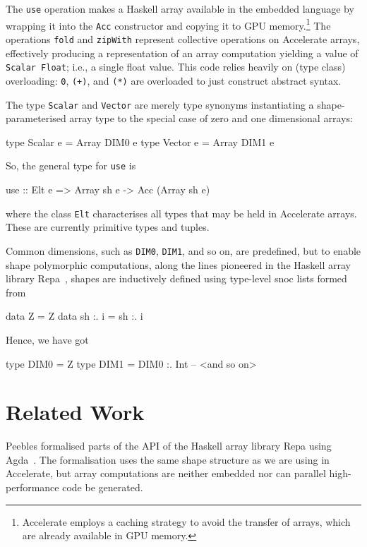 \documentclass{llncs}
\begin{document}
The \verb+use+ operation makes a Haskell array available in the embedded language by wrapping it into the \verb+Acc+ constructor and copying it to GPU memory.\footnote{Accelerate employs a caching strategy to avoid the transfer of arrays, which are already available in GPU memory.} The operations \texttt{fold} and \texttt{zipWith} represent collective operations on Accelerate arrays, effectively producing a representation of an array computation yielding a value of
\texttt{Scalar Float}; i.e., a single float value. This code relies
heavily on (type class) overloading: \texttt{0}, \texttt{(+)}, and
\texttt{(*)} are overloaded to just construct abstract syntax. 

The type \verb+Scalar+ and \verb+Vector+ are merely type synonyms instantiating a shape-parameterised array type to the special case of zero and one dimensional arrays:
%
\begin{hcode}
type Scalar e = Array DIM0 e
type Vector e = Array DIM1 e
\end{hcode}
%
So, the general type for \verb+use+ is
%
\begin{hcode}
use :: Elt e => Array sh e -> Acc (Array sh e)
\end{hcode}
%
where the class \verb+Elt+ characterises all types that may be held in Accelerate arrays. These are currently primitive types and tuples.

Common dimensions, such as \verb+DIM0+, \verb+DIM1+, and so on, are predefined, but to enable shape polymorphic computations, along the lines pioneered in the Haskell array library Repa~\cite{keller-etal:repa}, shapes are inductively defined using type-level snoc lists formed from
%
\begin{hcode}
data Z       = Z
data sh :. i = sh :. i
\end{hcode}
%
Hence, we have got
%
\begin{hcode}
type DIM0 = Z
type DIM1 = DIM0 :. Int
-- <and so on>
\end{hcode}

\section{Related Work}
\label{sec:related-work}

Peebles formalised parts of the API of the Haskell array library Repa using Agda~\cite{peebles:derpa}. The formalisation uses the same shape structure as we are using in Accelerate, but array computations are neither embedded nor can parallel high-performance code be generated.
\end{document}
